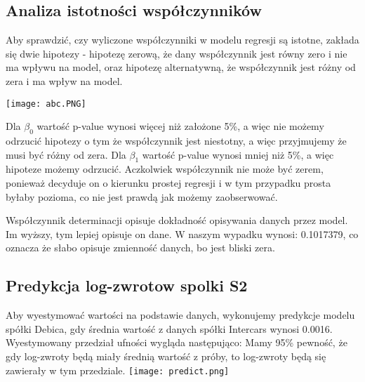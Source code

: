 \documentclass[a4paper,11pt]{article}
\def\\{\hfill\break}
\begin{document}
\subsection{Analiza istotności współczynników}
Aby sprawdzić, czy wyliczone współczynniki w modelu regresji są istotne, zakłada się dwie hipotezy - hipotezę zerową, że dany współczynnik jest równy zero i nie ma wpływu na model, oraz hipotezę alternatywną, że współczynnik jest różny od zera i ma wpływ na model.
\begin{center}
\texttt{[image: abc.PNG]}\\
\end{center}
Dla $\beta_0$ wartość p-value wynosi więcej niż założone 5\%, a więc nie możemy odrzucić hipotezy o tym że współczynnik jest niestotny, a więc przyjmujemy że musi być różny od zera. 
Dla $\beta_1$ wartość p-value wynosi mniej niż 5\%, a więc hipoteze możemy odrzucić. Aczkolwiek współczynnik nie może być zerem, ponieważ decyduje on o kierunku prostej regresji i w tym przypadku prosta byłaby pozioma, co nie jest prawdą jak możemy zaobserwować.\\

Współczynnik determinacji opisuje dokładność opisywania danych przez model. Im wyższy, tym lepiej opisuje on dane. \\W naszym wypadku wynosi: 0.1017379, co oznacza że słabo opisuje zmienność danych, bo jest bliski zera.

\subsection{Predykcja log-zwrotow spolki S2}
Aby wyestymować wartości na podstawie danych, wykonujemy predykcje modelu spółki Debica, gdy średnia wartość z danych spółki Intercars wynosi 0.0016. Wyestymowany przedział ufności wygląda następująco: \\\\
Mamy 95\% pewność, że gdy log-zwroty będą miały średnią wartość z próby, to log-zwroty będą się zawierały w tym przedziale.\\
\texttt{[image: predict.png]}
\end{document}
